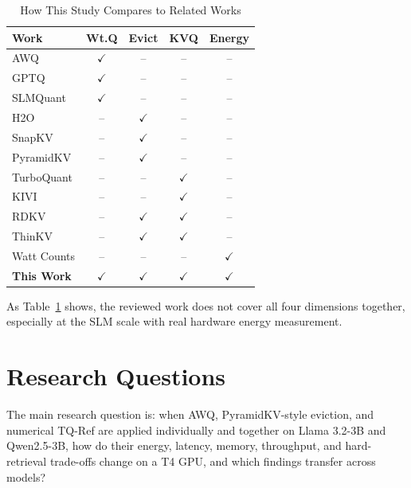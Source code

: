 \documentclass[conference]{IEEEtran}
\newcommand{\cmark}{\ensuremath{\checkmark}}
\begin{document}
\begin{table}[htbp]
\caption{How This Study Compares to Related Works}
\label{tab:comparison}
\centering
\renewcommand{\arraystretch}{1.2}
\begin{tabular}{lcccc}
\toprule
\textbf{Work} & \textbf{Wt.Q} & \textbf{Evict} & \textbf{KVQ} & \textbf{Energy} \\
\midrule
AWQ \cite{lin_awq_2025}              & \cmark & -- & -- & -- \\
GPTQ \cite{frantar_gptq_2023}            & \cmark & -- & -- & -- \\
SLMQuant \cite{wang_slmquant_2025}    & \cmark & -- & -- & -- \\
H2O \cite{zhang_h2o_nodate}              & -- & \cmark & -- & -- \\
SnapKV \cite{li_snapkv_nodate}        & -- & \cmark & -- & -- \\
PyramidKV \cite{cai_pyramidkv_2025}  & -- & \cmark & -- & -- \\
TurboQuant \cite{zandieh_turboquant_2025}& -- & -- & \cmark & -- \\
KIVI \cite{liu_kivi_2023}            & -- & -- & \cmark & -- \\
RDKV \cite{zhang_rdkv_2026}            & -- & \cmark & \cmark & -- \\
ThinKV \cite{ramachandran_thinkv_2026}        & -- & \cmark & \cmark & -- \\
Watt Counts \cite{argerich_watt_2026}& -- & -- & -- & \cmark \\
\textbf{This Work}          & \cmark & \cmark & \cmark & \cmark \\
\bottomrule
\end{tabular}
\end{table}

As Table~\ref{tab:comparison} shows, the reviewed work does not cover all four dimensions together, especially at the SLM scale with real hardware energy measurement.


\section{Research Questions}

The main research question is: when AWQ, PyramidKV-style eviction, and numerical TQ-Ref are applied individually and together on Llama 3.2-3B and Qwen2.5-3B, how do their energy, latency, memory, throughput, and hard-retrieval trade-offs change on a T4 GPU, and which findings transfer across models?
\end{document}

